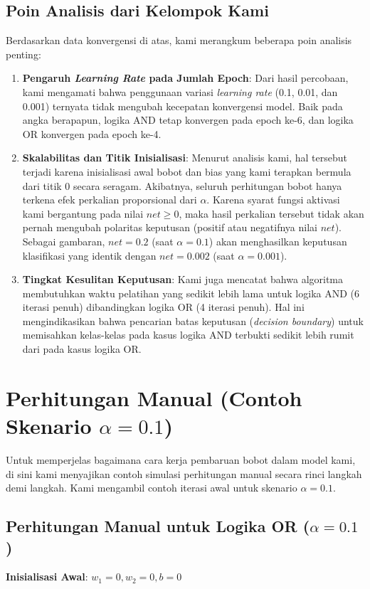 \documentclass[12pt,a4paper]{article}
\begin{document}
\subsection{Poin Analisis dari Kelompok Kami}
Berdasarkan data konvergensi di atas, kami merangkum beberapa poin analisis penting:
\begin{enumerate}
    \item \textbf{Pengaruh \textit{Learning Rate} pada Jumlah Epoch}: Dari hasil percobaan, kami mengamati bahwa penggunaan variasi \textit{learning rate} (0.1, 0.01, dan 0.001) ternyata tidak mengubah kecepatan konvergensi model. Baik pada angka berapapun, logika AND tetap konvergen pada epoch ke-6, dan logika OR konvergen pada epoch ke-4.
    \item \textbf{Skalabilitas dan Titik Inisialisasi}: Menurut analisis kami, hal tersebut terjadi karena inisialisasi awal bobot dan bias yang kami terapkan bermula dari titik 0 secara seragam. Akibatnya, seluruh perhitungan bobot hanya terkena efek perkalian proporsional dari $\alpha$. Karena syarat fungsi aktivasi kami bergantung pada nilai $net \ge 0$, maka hasil perkalian tersebut tidak akan pernah mengubah polaritas keputusan (positif atau negatifnya nilai $net$). Sebagai gambaran, $net = 0.2$ (saat $\alpha=0.1$) akan menghasilkan keputusan klasifikasi yang identik dengan $net = 0.002$ (saat $\alpha=0.001$).
    \item \textbf{Tingkat Kesulitan Keputusan}: Kami juga mencatat bahwa algoritma membutuhkan waktu pelatihan yang sedikit lebih lama untuk logika AND (6 iterasi penuh) dibandingkan logika OR (4 iterasi penuh). Hal ini mengindikasikan bahwa pencarian batas keputusan (\textit{decision boundary}) untuk memisahkan kelas-kelas pada kasus logika AND terbukti sedikit lebih rumit dari pada kasus logika OR.
\end{enumerate}

\newpage
\section{Perhitungan Manual (Contoh Skenario $\alpha = 0.1$)}

Untuk memperjelas bagaimana cara kerja pembaruan bobot dalam model kami, di sini kami menyajikan contoh simulasi perhitungan manual secara rinci langkah demi langkah. Kami mengambil contoh iterasi awal untuk skenario $\alpha = 0.1$.

\subsection{Perhitungan Manual untuk Logika OR ($\alpha = 0.1$)}
\textbf{Inisialisasi Awal}: $w_1 = 0, w_2 = 0, b = 0$
\end{document}
